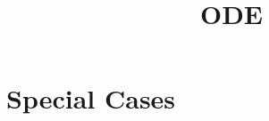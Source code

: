 \documentclass[12pt]{report}
\title{ODE}
\theoremstyle{definition}\newtheorem*{definition}{Definition}
\theoremstyle{definition}\newtheorem*{remark}{Remark}
\begin{document}
\maketitle
\tableofcontents

\chapter{Special Cases}

\end{document}
